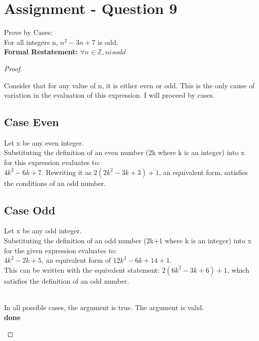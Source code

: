 \documentclass{article}
\begin{document}
\section*{Assignment - Question 9}
Prove by Cases:\\
For all integers n, $n^2-3n+7$ is odd.\\
\textbf{Formal Restatement:}
$\forall n \in \mathbb{Z}, n is odd$
\begin{proof}
  \begin{addmargin}{1em}
    Consider that for any value of n, it is either even or odd. This is the only cause of variation in the evaluation of this expression. I will proceed by cases.\\
    \subsection*{Case Even}
    \begin{addmargin}{1em}
      Let x be any even integer.\\
      Substituting the definition of an even number (2k where k is an integer) into x for this expression evaluates to:\\
      $4k^2-6k+7$. Rewriting it as $2(2k^2-3k+3)+1$, an equivalent form, satisfies the conditions of an odd number.\\
    \end{addmargin}
    \subsection*{Case Odd}
    \begin{addmargin}{1em}
      Let x be any odd integer.\\
      Substituting the definition of an odd number (2k+1 where k is an integer) into x for the given expression evaluates to:\\
      $4k^2-2k+5$, an equivalent form of $12k^2-6k+14+1$.\\
      This can be written with the equivalent statement: $2(6k^2-3k+6)+1$, which satisfies the definition of an odd number.\\\\
    \end{addmargin}
    In all possible cases, the argument is true. The argument is valid.\\ \textbf{done}
  \end{addmargin}
\end{proof}
\end{document}
